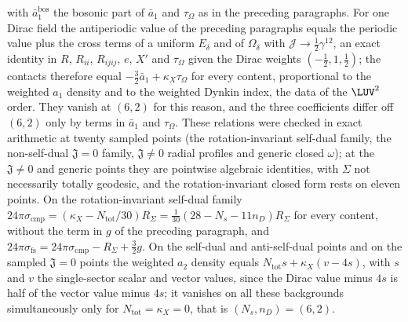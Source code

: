 with \(\bar a_1^{\mathrm{bos}}\) the bosonic part of \(\bar a_1\) and \(\tau_\Omega\) as in the preceding paragraphs. For one Dirac field the antiperiodic value of the preceding paragraphs equals the periodic value plus the cross terms of a uniform \(E_\delta\) and of \(\Omega_\delta\) with \(\mathcal J\to\tfrac12\gamma^{12}\), an exact identity in \(R\), \(R_{ii}\), \(R_{ijij}\), \(e\), \(X'\) and \(\tau_\Omega\) given the Dirac weights \((-\tfrac12,1,\tfrac12)\); the contacts therefore equal \(-\tfrac32\bar a_1+\kappa_X\tau_\Omega\) for every content, proportional to the weighted \(a_1\) density and to the weighted Dynkin index, the data of the \(\LUV^2\) order. They vanish at \((6,2)\) for this reason, and the three coefficients differ off \((6,2)\) only by terms in \(\bar a_1\) and \(\tau_\Omega\). These relations were checked in exact arithmetic at twenty sampled points (the rotation-invariant self-dual family, the non-self-dual \(\mathfrak J=0\) family, \(\mathfrak J\neq0\) radial profiles and generic closed \(\omega\)); at the \(\mathfrak J\neq0\) and generic points they are pointwise algebraic identities, with \(\Sigma\) not necessarily totally geodesic, and the rotation-invariant closed form rests on eleven points. On the rotation-invariant self-dual family \(24\pi\sigma_{\mathrm{cmp}}=(\kappa_X-N_{\mathrm{tot}}/30)R_\Sigma=\tfrac{1}{30}(28-N_s-11n_D)R_\Sigma\) for every content, without the term in \(g\) of the preceding paragraph, and \(24\pi\sigma_{\mathrm{fs}}=24\pi\sigma_{\mathrm{cmp}}-R_\Sigma+\tfrac32g\). On the self-dual and anti-self-dual points and on the sampled \(\mathfrak J=0\) points the weighted \(a_2\) density equals \(N_{\mathrm{tot}}s+\kappa_X(v-4s)\), with \(s\) and \(v\) the single-sector scalar and vector values, since the Dirac value minus \(4s\) is half of the vector value minus \(4s\); it vanishes on all these backgrounds simultaneously only for \(N_{\mathrm{tot}}=\kappa_X=0\), that is \((N_s,n_D)=(6,2)\).



